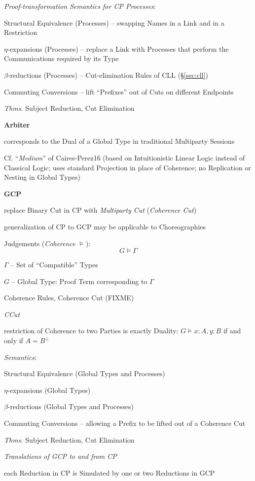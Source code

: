 \emph{Proof-transformation Semantics for CP Processes}:

Structural Equivalence (Processes) -- swapping Names in a Link and in a
Restriction

$\eta$-expansions (Processes) -- replace a Link with Processes that
perform the Communications required by its Type

$\beta$-reductions (Processes) -- Cut-elimination Rules of CLL
(\S\ref{sec:cll})

Commuting Conversions -- lift ``Prefixes'' out of Cuts on different
Endpoints

\emph{Thms.} Subject Reduction, Cut Elimination


\textbf{Arbiter}

corresponds to the Dual of a Global Type in traditional Multiparty
Sessions

\fist Cf. ``\emph{Medium}'' of Caires-Perez16 (based on Intuitionistic
Linear Logic instead of Classical Logic; uses standard Projection in
place of Coherence; no Replication or Nesting in Global Types)


\textbf{GCP}

replace Binary Cut in CP with \emph{Multiparty Cut} (\emph{Coherence
  Cut})

generalization of CP to GCP may be applicable to Choreographies

Judgements (\emph{Coherence} $\vDash$):
\[
  G \vDash \Gamma
\]

$\Gamma$ -- Set of ``Compatible'' Types

$G$ -- Global Type: Proof Term corresponding to $\Gamma$

Coherence Rules, Coherence Cut (FIXME)

\emph{CCut}

restriction of Coherence to two Parties is exactly Duality: $G \vDash
x:A,y:B$ if and only if $A = B^\bot$

\emph{Semantics}:

Structural Equivalence (Global Types and Processes)

$\eta$-expansions (Global Types)

$\beta$-reductions (Global Types and Processes)

Commuting Conversions -- allowing a Prefix to be lifted out of a
Coherence Cut

\emph{Thms.} Subject Reduction, Cut Elimination

\emph{Translations of GCP to and from CP} %

each Reduction in CP is Simulated by one or two Reductions in GCP

